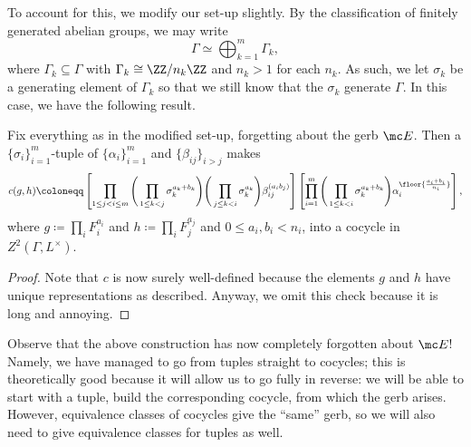 \documentclass{article}
\numberwithin{equation}{section}
\begin{document}
To account for this, we modify our set-up slightly. By the classification of finitely generated abelian groups, we may write
\[\Gamma\simeq\bigoplus_{k=1}^m\Gamma_k,\]
where $\Gamma_k\subseteq\Gamma$ with $\Gamma_k\cong\ZZ/n_k\ZZ$ and $n_k>1$ for each $n_k$. As such, we let $\sigma_k$ be a generating element of $\Gamma_k$ so that we still know that the $\sigma_k$ generate $\Gamma$. In this case, we have the following result.
\begin{theorem} \label{thm:getcocycle}
	Fix everything as in the modified set-up, forgetting about the gerb $\mc E$. Then a $\{\sigma_i\}_{i=1}^m$-tuple of $\{\alpha_i\}_{i=1}^m$ and $\{\beta_{ij}\}_{i>j}$ makes
	\[c(g,h)\coloneqq\left[\prod_{1\le j<i\le m}\Bigg(\prod_{1\le k<j}\sigma_k^{a_k+b_k}\Bigg)\Bigg(\prod_{j\le k<i}\sigma_k^{a_k}\Bigg)\beta_{ij}^{(a_ib_j)}\right]\left[\prod_{i=1}^m\Bigg(\prod_{1\le k<i}\sigma_k^{a_k+b_k}\Bigg)\alpha_i^{\floor{\frac{a_i+b_i}{n_i}}}\right],\]
	where $g\coloneqq\prod_iF_i^{a_i}$ and $h\coloneqq\prod_iF_j^{a_j}$ and $0\le a_i,b_i<n_i$, into a cocycle in $Z^2(\Gamma,L^\times)$.
\end{theorem}
\begin{proof}
	Note that $c$ is now surely well-defined because the elements $g$ and $h$ have unique representations as described. Anyway, we omit this check because it is long and annoying.
\end{proof}
Observe that the above construction has now completely forgotten about $\mc E$! Namely, we have managed to go from tuples straight to cocycles; this is theoretically good because it will allow us to go fully in reverse: we will be able to start with a tuple, build the corresponding cocycle, from which the gerb arises. However, equivalence classes of cocycles give the ``same'' gerb, so we will also need to give equivalence classes for tuples as well.
\end{document}
